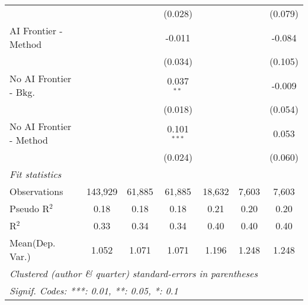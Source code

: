 \begin{tabular}{lcccccc}
                           &               &               & (0.028)       &              &              & (0.079)\\   
   AI Frontier - Method    &               &               & -0.011        &              &              & -0.084\\   
                           &               &               & (0.034)       &              &              & (0.105)\\   
   No AI Frontier - Bkg.   &               &               & 0.037$^{**}$  &              &              & -0.009\\   
                           &               &               & (0.018)       &              &              & (0.054)\\   
   No AI Frontier - Method &               &               & 0.101$^{***}$ &              &              & 0.053\\   
                           &               &               & (0.024)       &              &              & (0.060)\\   
   \midrule
   \emph{Fit statistics}\\
   Observations            & 143,929       & 61,885        & 61,885        & 18,632       & 7,603        & 7,603\\  
   Pseudo R$^2$            & 0.18          & 0.18          & 0.18          & 0.21         & 0.20         & 0.20\\  
   R$^2$                   & 0.33          & 0.34          & 0.34          & 0.40         & 0.40         & 0.40\\  
Mean(Dep. Var.) & 1.052 & 1.071 & 1.071 & 1.196 & 1.248 & 1.248 \\
   \midrule \midrule
   \multicolumn{7}{l}{\emph{Clustered (author \& quarter) standard-errors in parentheses}}\\
   \multicolumn{7}{l}{\emph{Signif. Codes: ***: 0.01, **: 0.05, *: 0.1}}\\
\end{tabular}
\par\endgroup
